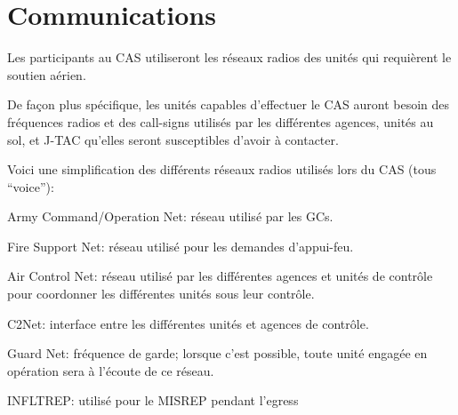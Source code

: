\chapter{Communications}

\e
    \item Les participants au CAS utiliseront les réseaux radios des unités qui requièrent le soutien aérien.
    \item
    De façon plus spécifique, les unités capables d’effectuer le CAS auront besoin des fréquences radios et des call-signs utilisés par les différentes agences, unités au sol, et J-TAC qu’elles seront susceptibles d’avoir à contacter.
    \item Voici une simplification des différents réseaux radios utilisés lors du CAS (tous ``voice''):
    \ee
        \item Army Command/Operation Net: réseau utilisé par les GCs.
        \item Fire Support Net: réseau utilisé pour les demandes d’appui-feu.
        \item Air Control Net: réseau utilisé par les différentes agences et unités de contrôle pour coordonner les différentes unités sous leur contrôle.
        \item C2Net: interface entre les différentes unités et agences de contrôle.
        \item Guard Net: fréquence de garde; lorsque c’est possible, toute unité engagée en opération sera à l’écoute de ce réseau.
        \item INFLTREP: utilisé pour le MISREP pendant l’egress
    \ed
\ed
